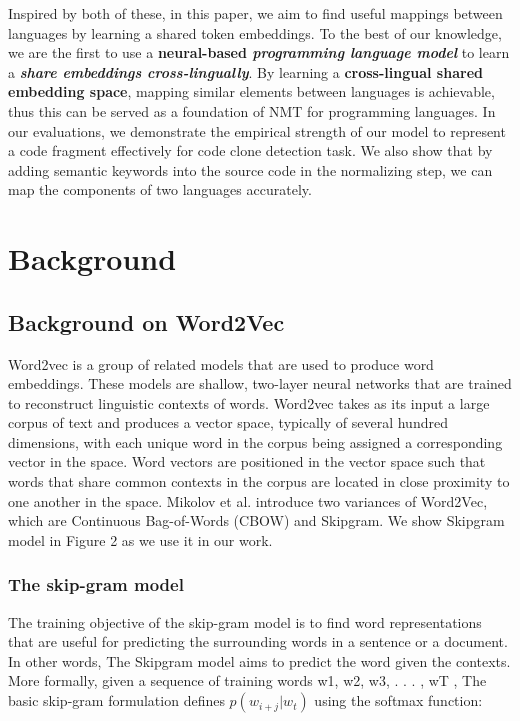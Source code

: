 Inspired by both of these, in this paper, we aim to find useful mappings between languages by learning a shared token embeddings. To the best of our knowledge, we are the first to use a \textbf{neural-based \textit{programming language model}} to learn a \textbf{\textit{share embeddings cross-lingually}}. By learning a \textbf{cross-lingual shared embedding space}, mapping similar elements between languages is achievable, thus this can be served as a foundation of NMT for programming languages. In our evaluations, we demonstrate the empirical strength of our model to represent a code fragment effectively for code clone detection task. We also show that by adding semantic keywords into the source code in the normalizing step, we can map the components of two languages accurately. 

\section{Background}

\subsection{Background on Word2Vec}

Word2vec is a group of related models that are used to produce word embeddings. These models are shallow, two-layer neural networks that are trained to reconstruct linguistic contexts of words. Word2vec takes as its input a large corpus of text and produces a vector space, typically of several hundred dimensions, with each unique word in the corpus being assigned a corresponding vector in the space. Word vectors are positioned in the vector space such that words that share common contexts in the corpus are located in close proximity to one another in the space. Mikolov et al.\cite{mikolov2013distributed} introduce two variances of Word2Vec, which are Continuous Bag-of-Words (CBOW) and Skipgram. We show Skipgram model in Figure 2 as we use it in our work.

\subsubsection{The skip-gram model}
The training objective of the skip-gram model is to find word representations that are useful for predicting the surrounding words in a sentence or a document. In other words, The Skipgram model aims to predict the word given the contexts. More formally, given a sequence of training words w1, w2, w3, . . . , wT , The basic skip-gram formulation defines \begin{math}p(w_{i+j} | w_{t})\end{math} using the softmax function:

